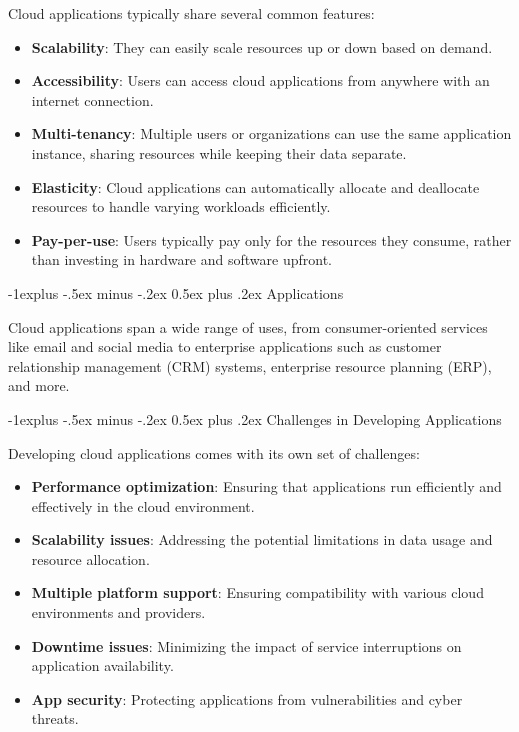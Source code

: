 \documentclass[10pt, landscape]{article}
\makeatletter
\renewcommand{\subsection}{\@startsection{subsection}{2}{0mm}%
  {-1explus -.5ex minus -.2ex}%
  {0.5ex plus .2ex}%
{\normalfont\normalsize\bfseries}}
\makeatother
\begin{document}
\begin{multicols*}{4}
Cloud applications typically share several common features:

\begin{itemize}
\tightlist
\item
  \textbf{Scalability}: They can easily scale resources up or down based
  on demand.
\item
  \textbf{Accessibility}: Users can access cloud applications from
  anywhere with an internet connection.
\item
  \textbf{Multi-tenancy}: Multiple users or organizations can use the
  same application instance, sharing resources while keeping their data
  separate.
\item
  \textbf{Elasticity}: Cloud applications can automatically allocate and
  deallocate resources to handle varying workloads efficiently.
\item
  \textbf{Pay-per-use}: Users typically pay only for the resources they
  consume, rather than investing in hardware and software upfront.
\end{itemize}

\subsection{Applications}\label{applications}

Cloud applications span a wide range of uses, from consumer-oriented
services like email and social media to enterprise applications such as
customer relationship management (CRM) systems, enterprise resource
planning (ERP), and more.

\subsection{Challenges in Developing
Applications}\label{challenges-in-developing-applications}

Developing cloud applications comes with its own set of challenges:

\begin{itemize}
\tightlist
\item
  \textbf{Performance optimization}: Ensuring that applications run
  efficiently and effectively in the cloud environment.
\item
  \textbf{Scalability issues}: Addressing the potential limitations in
  data usage and resource allocation.
\item
  \textbf{Multiple platform support}: Ensuring compatibility with
  various cloud environments and providers.
\item
  \textbf{Downtime issues}: Minimizing the impact of service
  interruptions on application availability.
\item
  \textbf{App security}: Protecting applications from vulnerabilities
  and cyber threats.
\end{itemize}


\end{multicols*}
\end{document}
